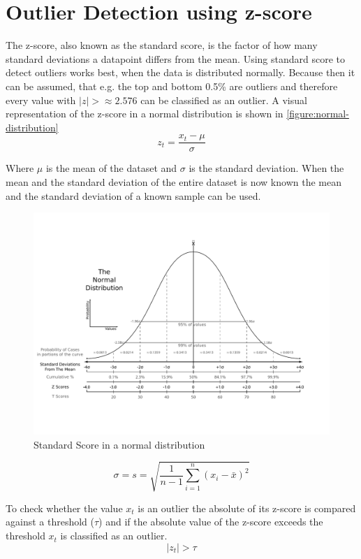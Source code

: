 \section{Outlier Detection using z-score}
\label{section:outlier-detection-z-score}
The z-score, also known as the standard score, is the factor of how many standard deviations a datapoint differs from the mean. Using standard score to detect outliers works best, when the data is distributed normally. Because then it can be assumed, that e.g. the top and bottom 0.5\% are outliers and therefore every value with $|z| > \approx 2.576$ can be classified as an outlier. %
A visual representation of the z-score in a normal distribution is shown in \autoref{figure:normal-distribution}
\begin{equation}
  z_t = \frac{x_t - \mu}{\sigma}
\end{equation}

Where $\mu$ is the mean of the dataset and $\sigma$ is the standard deviation. When the mean and the standard deviation of the entire dataset is now known the mean and the standard deviation of a known sample can be used.
\cite{DetectionSpatialOutlier, teschlSpezielleStetigeVerteilungen2014, rousseeuwAnomalyDetectionRobust2018}
\begin{figure}[H]
  \centering
  \includegraphics[width=\textwidth]{./pics/The_Normal_Distribution.pdf}
  \caption{Standard Score in a normal distribution\cite{StandardScore2022}}
  \label{figure:normal-distribution}
\end{figure}
\begin{equation}
  \sigma = s = \sqrt{\frac{1}{n-1}\sum^n_{i=1}{(x_i - \bar{x})^2}}
\end{equation}
\cite{teschlSpezielleStetigeVerteilungen2014, rousseeuwAnomalyDetectionRobust2018}
\par
To check whether the value $x_t$ is an outlier the absolute of its z-score is compared against a threshold ($\tau$) and if the absolute value of the z-score exceeds the threshold $x_t$ is classified as an outlier.
\begin{equation}
  |z_t| > \tau
\end{equation}

